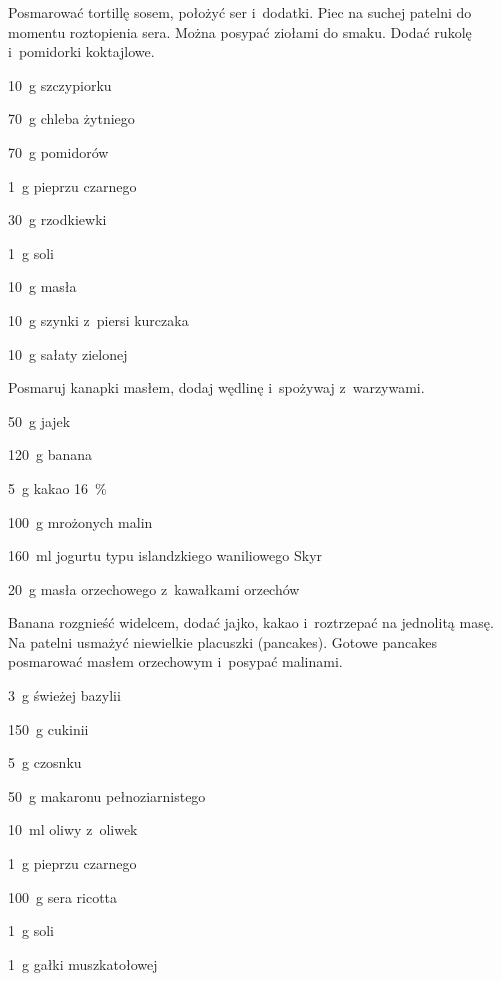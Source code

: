 \documentclass[../kucharek.tex]{subfiles}
\begin{document}
Posmarować tortillę sosem, położyć ser i~dodatki. Piec na suchej patelni do
momentu roztopienia sera. Można posypać ziołami do smaku. Dodać rukolę
i~pomidorki koktajlowe.


\begin{Ingred}
    \item \qty{10}{\gram} szczypiorku
    \item \qty{70}{\gram} chleba żytniego
    \item \qty{70}{\gram} pomidorów
    \item \qty{1}{\gram} pieprzu czarnego
    \item \qty{30}{\gram} rzodkiewki
    \item \qty{1}{\gram} soli
    \item \qty{10}{\gram} masła
    \item \qty{10}{\gram} szynki z~piersi kurczaka
    \item \qty{10}{\gram} sałaty zielonej
\end{Ingred}

Posmaruj kanapki masłem, dodaj wędlinę i~spożywaj z~warzywami.


\begin{Ingred}
    \item \qty{50}{\gram} jajek
    \item \qty{120}{\gram} banana
    \item \qty{5}{\gram} kakao \qty{16}{\percent}
    \item \qty{100}{\gram} mrożonych malin
    \item \qty{160}{\milli\litre} jogurtu typu islandzkiego waniliowego Skyr
    \item \qty{20}{\gram} masła orzechowego z~kawałkami orzechów
\end{Ingred}

Banana rozgnieść widelcem, dodać jajko, kakao i~roztrzepać na jednolitą masę.
Na patelni usmażyć niewielkie placuszki (pancakes). Gotowe pancakes posmarować
masłem orzechowym i~posypać malinami.


\begin{Ingred}
    \item \qty{3}{\gram} świeżej bazylii
    \item \qty{150}{\gram} cukinii
    \item \qty{5}{\gram} czosnku
    \item \qty{50}{\gram} makaronu pełnoziarnistego
    \item \qty{10}{\milli\litre} oliwy z~oliwek
    \item \qty{1}{\gram} pieprzu czarnego
    \item \qty{100}{\gram} sera ricotta
    \item \qty{1}{\gram} soli
    \item \qty{1}{\gram} gałki muszkatołowej
\end{Ingred}
\end{document}
